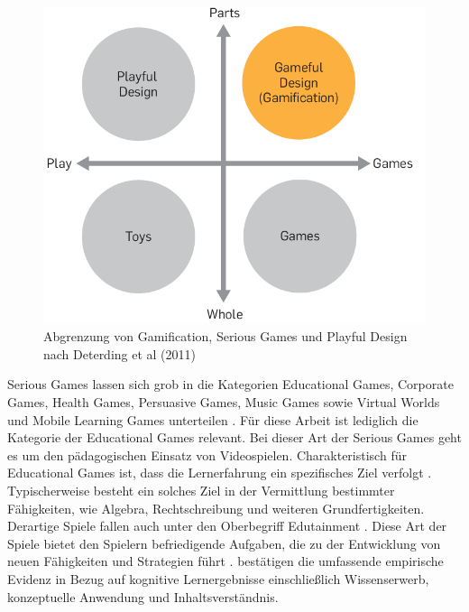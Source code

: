\begin{figure}[htp]
    \centering
    \includegraphics{img/detering_gamificatrion_pic.png}
    \caption{Abgrenzung von Gamification, Serious Games und Playful Design nach Deterding et al (2011)}
    \label{fig:deterding}
\end{figure}

Serious Games lassen sich grob in die Kategorien Educational  Games, 
Corporate  Games,  Health  Games,  Persuasive  Games,  Music  Games  sowie  Virtual  Worlds  und 
Mobile Learning Games unterteilen \cite[S.4]{bopp_serious_2009}.
Für diese Arbeit ist lediglich die Kategorie der Educational  Games relevant.
Bei dieser Art der Serious Games geht es um den pädagogischen Einsatz von Videospielen.
Charakteristisch für Educational  Games ist, dass die Lernerfahrung ein spezifisches Ziel verfolgt \cite{nielsen_overview_2006, bopp_serious_2009}.
Typischerweise besteht ein solches Ziel in der Vermittlung bestimmter Fähigkeiten, wie Algebra, Rechtschreibung und weiteren Grundfertigkeiten.
Derartige Spiele fallen auch unter den Oberbegriff Edutainment \cite{nielsen_overview_2006}.
Diese Art der Spiele bietet den Spielern befriedigende Aufgaben, die zu der Entwicklung von neuen Fähigkeiten und Strategien führt \cite{stapleton_serious_2004}.
 bestätigen die umfassende empirische Evidenz in Bezug auf kognitive Lernergebnisse einschließlich Wissenserwerb, konzeptuelle Anwendung und Inhaltsverständnis.

